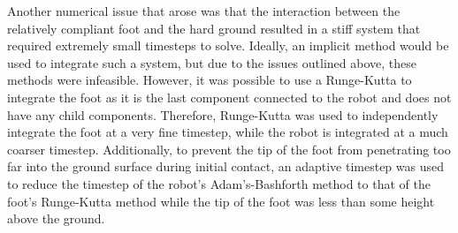 \documentclass[letterpaper]{article}
\begin{document}
Another numerical issue that arose was that the interaction between the relatively compliant foot and the hard ground resulted in a stiff system that required extremely small timesteps to solve. Ideally, an implicit method would be used to integrate such a system, but due to the issues outlined above, these methods were infeasible. However, it was possible to use a Runge-Kutta to integrate the foot as it is the last component connected to the robot and does not have any child components. Therefore, Runge-Kutta was used to independently integrate the foot at a very fine timestep, while the robot is integrated at a much coarser timestep. Additionally, to prevent the tip of the foot from penetrating too far into the ground surface during initial contact, an adaptive timestep was used to reduce the timestep of the robot's Adam's-Bashforth method to that of the foot's Runge-Kutta method while the tip of the foot was less than some height above the ground. 



{}

\end{document}
